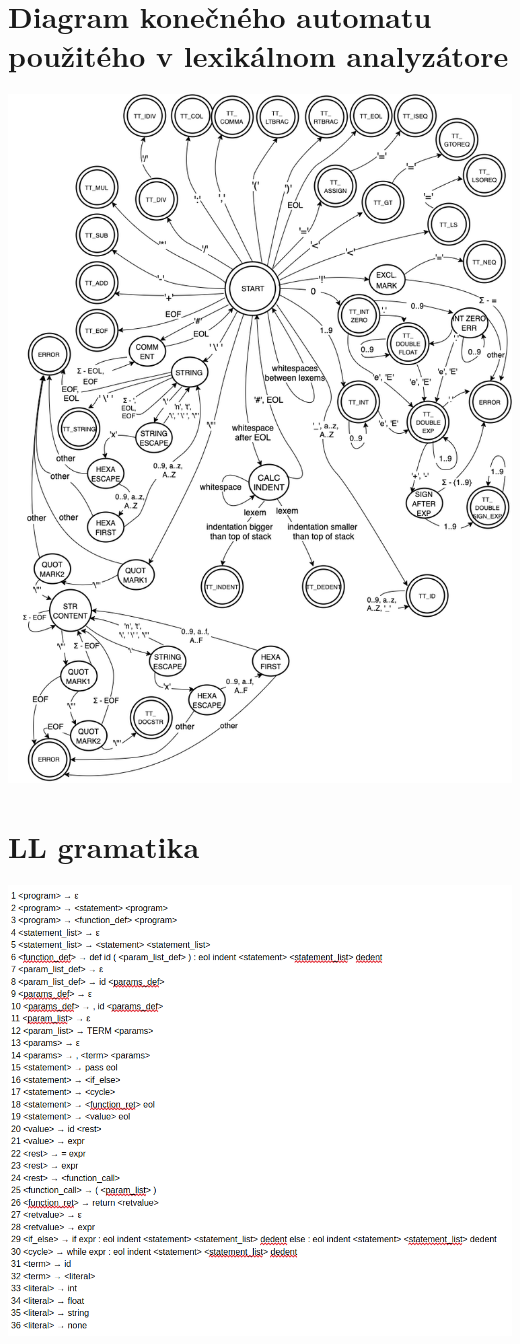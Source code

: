 \documentclass{article}
\begin{document}
	\section{Diagram konečného automatu použitého v lexikálnom analyzátore }
	\center\includegraphics[width=0.9\linewidth]{./with_error_state.png}
	\section{LL gramatika}
	\center\includegraphics[width=0.9\linewidth]{./LLgrammar.png}
\end{document}
